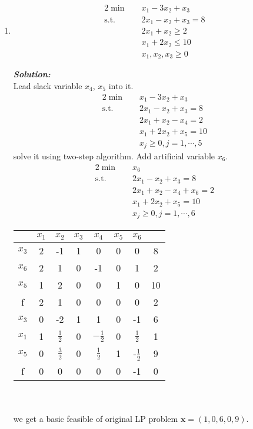 \documentclass[paper=a4, fontsize=11pt]{scrartcl} %
\numberwithin{equation}{section} %
\numberwithin{figure}{section} %
\numberwithin{table}{section} %
\begin{document}
\begin{enumerate}
\item
\begin{alignat}{2}          \nonumber
\min\quad & x_1-3x_2+x_3\\    \nonumber
\mbox{s.t.}\quad            \nonumber
& 2x_1-x_2+x_3 = 8\\        \nonumber
& 2x_1+x_2 \geq 2\\         \nonumber
& x_1+2x_2 \leq 10\\          \nonumber
& x_1,x_2,x_3\geq0
\end{alignat}

\emph{\textbf{Solution:}}\\
Lead slack variable $x_4$, $x_5$ into it.
\begin{alignat}{2}          \nonumber
\min\quad & x_1-3x_2+x_3\\    \nonumber
\mbox{s.t.}\quad            \nonumber
& 2x_1-x_2+x_3 = 8\\        \nonumber
& 2x_1+x_2-x_4 = 2\\         \nonumber
& x_1+2x_2+x_5 = 10\\          \nonumber
& x_j\geq0, j=1,\cdots,5
\end{alignat}
solve it using two-step algorithm. Add artificial variable $x_6$.\\
\begin{alignat}{2}          \nonumber
\min\quad & x_6\\    \nonumber
\mbox{s.t.}\quad            \nonumber
& 2x_1-x_2+x_3 = 8\\        \nonumber
& 2x_1+x_2-x_4+x_6 = 2\\         \nonumber
& x_1+2x_2+x_5 = 10\\          \nonumber
& x_j\geq0, j=1,\cdots,6
\end{alignat}

\begin{tabular}{|c|c|c|c|c|c|c|c|}
\hline &$x_1$&$x_2$&$x_3$&$x_4$&$x_5$&$x_6$&\\
\hline$x_3$&2&-1&1&0&0&0&8\\
$x_6$&\Large{\textcircled{\small{2}}}&1&0&-1&0&1&2\\
$x_5$&1&2&0&0&1&0&10\\
\hline f&2&1&0&0&0&0&2\\
\hline
\hline $x_3$&0 &-2& 1& 1& 0& -1&6\\
$x_1$&1&$\frac{1}{2}$&0&$-\frac{1}{2}$&0&$\frac{1}{2}$&1\\
$x_5$&0&\Large{\textcircled{\small{$\frac{3}{2}$}}}&0&$\frac{1}{2}$ & 1&-$\frac{1}{2}$&9\\
\hline f   & 0&0& 0& 0& 0& -1&0\\
\hline
\end{tabular}
\\\\
we get a basic feasible of original LP problem $\mathbf{x}=(1,0,6,0,9)$.


\end{enumerate}
\end{document}
